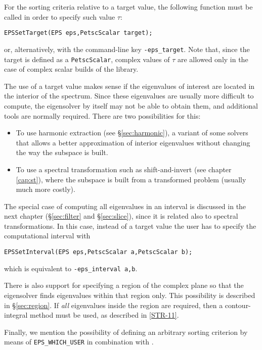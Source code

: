 For the sorting criteria relative to a target value, the following function must be called in order to specify such value $\tau$:
        \begin{Verbatim}[fontsize=\small]
        EPSSetTarget(EPS eps,PetscScalar target);
        \end{Verbatim}
or, alternatively, with the command-line key \Verb!-eps_target!. Note that, since the target is defined as a \texttt{PetscScalar}, complex values of $\tau$ are allowed only in the case of complex scalar builds of the \slepc library.

The use of a target value makes sense if the eigenvalues of interest are located in the interior of the spectrum. Since these eigenvalues are usually more difficult to compute, the eigensolver by itself may not be able to obtain them, and additional tools are normally required.
There are two possibilities for this:
\begin{itemize}
\item To use harmonic extraction (see \S\ref{sec:harmonic}), a variant of some solvers that allows a better approximation of interior eigenvalues without changing the way the subspace is built.
\item To use a spectral transformation such as shift-and-invert (see chapter \ref{cap:st}), where the subspace is built from a transformed problem (usually much more costly).
\end{itemize}

The special case of computing all eigenvalues in an interval is discussed in the next chapter (\S\ref{sec:filter} and \S\ref{sec:slice}), since it is related also to spectral transformations. In this case, instead of a target value the user has to specify the computational interval with
        \begin{Verbatim}[fontsize=\small]
        EPSSetInterval(EPS eps,PetscScalar a,PetscScalar b);
        \end{Verbatim}
which is equivalent to \Verb!-eps_interval a,b!.

There is also support for specifying a region of the complex plane so that the eigensolver finds eigenvalues within that region only. This possibility is described in \S\ref{sec:region}. If \emph{all} eigenvalues inside the region are required, then a contour-integral method must be used, as described in \hyperlink{str}{[STR-11]}.

Finally, we mention the possibility of defining an arbitrary sorting criterion by means of \texttt{EPS\_WHICH\_USER} in combination with .

